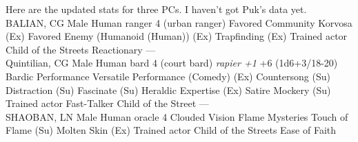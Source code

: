 Here are the updated stats for three PCs. I haven't got Puk's data yet.\\

BALIAN, CG Male Human ranger 4 (urban ranger)                    Favored Community Korvosa (Ex)  Favored Enemy (Humanoid (Human)) (Ex)  Trapfinding (Ex) Trained actor  Child of the Streets  Reactionary ---\\

Quintilian, CG Male Human bard 4 (court bard)        {\itshape rapier +1} +6 (1d6+3/18-20)              Bardic Performance  Versatile Performance (Comedy) (Ex)  Countersong (Su)  Distraction (Su)  Fascinate (Su)  Heraldic Expertise (Ex)  Satire  Mockery (Su) Trained actor  Fast-Talker  Child of the Street ---\\

SHAOBAN, LN Male Human oracle 4                Clouded Vision  Flame Mysteries  Touch of Flame (Su)   Molten Skin (Ex) Trained actor  Child of the Streets  Ease of Faith 